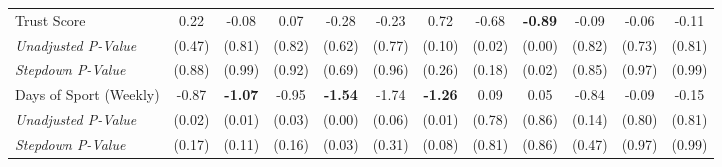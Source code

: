\begin{tabular}{l c c c c c c c c c c c}
Trust Score & 0.22 & -0.08 & 0.07 & -0.28 & -0.23 & 0.72 & -0.68 & \textbf{ -0.89 } & -0.09 & -0.06 & -0.11 \\
\quad \textit{Unadjusted P-Value} & (0.47) & (0.81) & (0.82) & (0.62) & (0.77) & (0.10) & (0.02) & (0.00) & (0.82) & (0.73) & (0.81) \\
\quad \textit{Stepdown P-Value} & (0.88) & (0.99) & (0.92) & (0.69) & (0.96) & (0.26) & (0.18) & (0.02) & (0.85) & (0.97) & (0.99) \\
Days of Sport (Weekly) & -0.87 & \textbf{ -1.07 } & -0.95 & \textbf{ -1.54 } & -1.74 & \textbf{ -1.26 } & 0.09 & 0.05 & -0.84 & -0.09 & -0.15 \\
\quad \textit{Unadjusted P-Value} & (0.02) & (0.01) & (0.03) & (0.00) & (0.06) & (0.01) & (0.78) & (0.86) & (0.14) & (0.80) & (0.81) \\
\quad \textit{Stepdown P-Value} & (0.17) & (0.11) & (0.16) & (0.03) & (0.31) & (0.08) & (0.81) & (0.86) & (0.47) & (0.97) & (0.99) \\
\bottomrule
\end{tabular}
